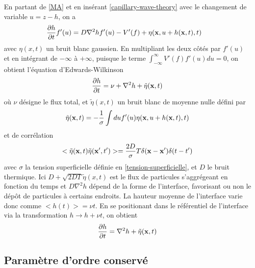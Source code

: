 En partant de \ref{MA} et en insérant \ref{capillary-wave-theory} avec le changement de variable $u= z-h$, on a \cite{bray_interface_2001}
\begin{align}
    \frac{\partial h}{\partial t} f'(u) &= D \nabla^2 h f'(u) - V'(f) + \eta({\bf x},u+h({\bf x},t),t)
\end{align}
avec $\eta(x,t)$ un bruit blanc gaussien. En multipliant les deux côtés par $f'(u)$ et en intégrant de $-\infty$ à $+\infty$, puisque le terme $ \int_{-\infty}^\infty V'(f) f'(u) du = 0$, on obtient l'équation d'Edwards-Wilkinson \cite{edwards_surface_1982} 
\begin{align}
     \frac{\partial h}{\partial t} = \nu + \nabla^2 h +  \tilde{\eta}({\bf x},t)
    \label{edwards-wilkinson}
\end{align}
où $\nu$ désigne le flux total, et $\tilde{\eta}(x,t)$  un bruit blanc de moyenne nulle défini par
\begin{align}
    \tilde{\eta}({\bf x},t) = - \frac{1}{\sigma} \int du f'(u) \eta({\bf x},u+h({\bf x},t),t)
\end{align}
et de corrélation 
\begin{align}
    <\tilde{\eta}({\bf x},t)\tilde{\eta}({\bf x}',t')> = \frac{2 D}{\sigma} T\delta({\bf x}-{\bf x}')\delta(t-t')
\end{align}
avec $\sigma$ la tension superficielle définie en \ref{tension-superficielle}, et $D$ le bruit thermique.
Ici $D+ \sqrt{2 D T} \tilde{\eta}(x,t)$ est le flux de particules s'aggrégeant en fonction du temps et $D \nabla^2 h$ dépend de la forme de l'interface, favorisant ou non le dépôt de particules à certains endroits.
La hauteur moyenne de l'interface varie donc comme $<h(t)> = \nu t$. En se positionant dans le référentiel de l'interface via la transformation $h \rightarrow h + \nu t$, on obtient
\begin{align}
     \frac{\partial h}{\partial t} =    \nabla^2 h +  \tilde{\eta}({\bf x},t)
    \label{edwards-wilkinson-conesrved}
\end{align}

    \subsection{Paramètre d'ordre conservé}

